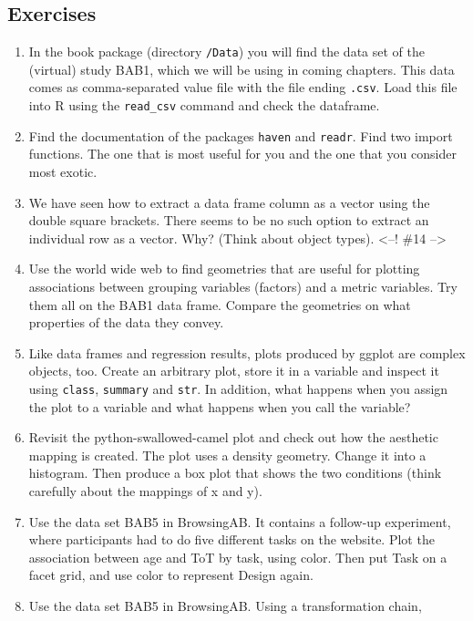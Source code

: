 \documentclass[]{svmono}
\begin{document}
\subsection{Exercises}\label{exercises-1}

\begin{enumerate}
\def\labelenumi{\arabic{enumi}.}
\item
  In the book package (directory \texttt{/Data}) you will find the data
  set of the (virtual) study BAB1, which we will be using in coming
  chapters. This data comes as comma-separated value file with the file
  ending \texttt{.csv}. Load this file into R using the
  \texttt{read\_csv} command and check the dataframe.
\item
  Find the documentation of the packages \texttt{haven} and
  \texttt{readr}. Find two import functions. The one that is most useful
  for you and the one that you consider most exotic.
\item
  We have seen how to extract a data frame column as a vector using the
  double square brackets. There seems to be no such option to extract an
  individual row as a vector. Why? (Think about object types).
  \textless{}--! \#14 --\textgreater{}
\item
  Use the world wide web to find geometries that are useful for plotting
  associations between grouping variables (factors) and a metric
  variables. Try them all on the BAB1 data frame. Compare the geometries
  on what properties of the data they convey.
\item
  Like data frames and regression results, plots produced by ggplot are
  complex objects, too. Create an arbitrary plot, store it in a variable
  and inspect it using \texttt{class}, \texttt{summary} and
  \texttt{str}. In addition, what happens when you assign the plot to a
  variable and what happens when you call the variable?
\item
  Revisit the python-swallowed-camel plot and check out how the
  aesthetic mapping is created. The plot uses a density geometry. Change
  it into a histogram. Then produce a box plot that shows the two
  conditions (think carefully about the mappings of x and y).
\item
  Use the data set BAB5 in BrowsingAB. It contains a follow-up
  experiment, where participants had to do five different tasks on the
  website. Plot the association between age and ToT by task, using
  color. Then put Task on a facet grid, and use color to represent
  Design again.
\item
  Use the data set BAB5 in BrowsingAB. Using a transformation chain,

\end{enumerate}
\end{document}
